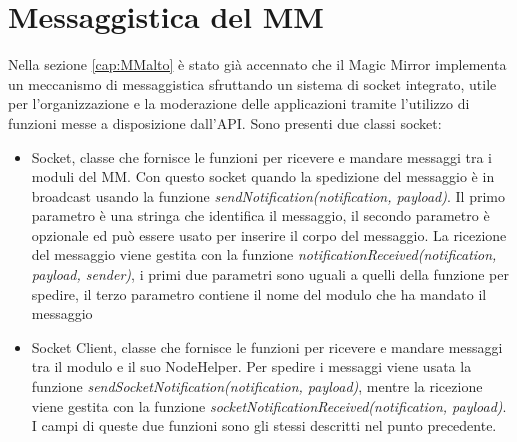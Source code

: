 \section{Messaggistica del MM}\label{cap:MMmess}
Nella sezione \ref{cap:MMalto} \`e stato gi\`a accennato che il Magic Mirror implementa un meccanismo di messaggistica sfruttando un sistema di socket integrato,
utile per l'organizzazione e la moderazione delle applicazioni tramite l'utilizzo di funzioni messe a disposizione dall'API.
Sono presenti due classi socket:
\begin{itemize}
\item Socket, classe che fornisce le funzioni per ricevere e mandare messaggi tra i moduli del MM. Con questo socket quando la spedizione
del messaggio è in broadcast usando la funzione \textit{sendNotification(notification, payload)}. Il primo parametro è una stringa che identifica
il messaggio, il secondo parametro è opzionale ed può essere usato per inserire il corpo del messaggio.
La ricezione del messaggio viene gestita con la funzione \textit{notificationReceived(notification, payload, sender)}, i primi due parametri sono
uguali a quelli della funzione per spedire, il terzo parametro contiene il nome del
modulo che ha mandato il messaggio
\item Socket Client, classe che fornisce le funzioni per ricevere e mandare messaggi tra il modulo e il suo NodeHelper. Per spedire
i messaggi viene usata la funzione \textit{sendSocketNotification(notification, payload)}, mentre la ricezione viene gestita con la funzione
 \textit{socketNotificationReceived(notification, payload)}. I campi di queste due funzioni sono gli stessi descritti nel punto precedente.\\[1\baselineskip]
\end{itemize}
